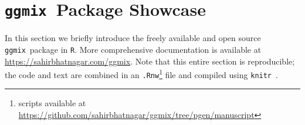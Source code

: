 \documentclass[12pt,letter]{article}\usepackage[]{graphicx}\usepackage[]{color}
\newcommand{\ggmix}{\texttt{ggmix}}
\begin{document}
 

 
 





























\FloatBarrier

























\FloatBarrier

\newpage


\section{\ggmix ~Package Showcase} \label{ap:showcase}

In this section we briefly introduce the freely available and open source \ggmix ~package in \texttt{R}. More comprehensive documentation is available at \url{https://sahirbhatnagar.com/ggmix}. Note that this entire section is reproducible; the code and text are combined in an \texttt{.Rnw}\footnote[1]{scripts available at \url{https://github.com/sahirbhatnagar/ggmix/tree/pgen/manuscript}} file and compiled using \texttt{knitr}~\citep{xie2015dynamic}.
\end{document}
